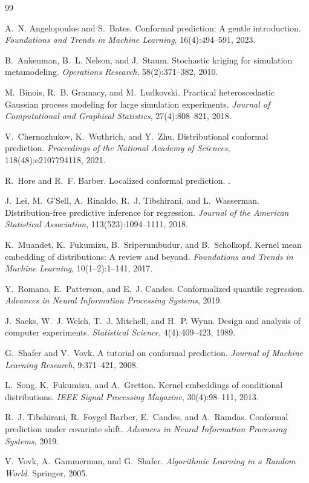\documentclass[11pt]{article}
\begin{document}
\begin{thebibliography}{99}

A.~N. Angelopoulos and S.~Bates.
\newblock Conformal prediction: A gentle introduction.
\newblock \emph{Foundations and Trends in Machine Learning}, 16(4):494--591, 2023.

B.~Ankenman, B.~L. Nelson, and J.~Staum.
\newblock Stochastic kriging for simulation metamodeling.
\newblock \emph{Operations Research}, 58(2):371--382, 2010.

M.~Binois, R.~B. Gramacy, and M.~Ludkovski.
\newblock Practical heteroscedastic Gaussian process modeling for large simulation experiments.
\newblock \emph{Journal of Computational and Graphical Statistics}, 27(4):808--821, 2018.

V.~Chernozhukov, K.~Wuthrich, and Y.~Zhu.
\newblock Distributional conformal prediction.
\newblock \emph{Proceedings of the National Academy of Sciences}, 118(48):e2107794118, 2021.

R.~Hore and R.~F. Barber.
\newblock Localized conformal prediction.
.

J.~Lei, M.~G'Sell, A.~Rinaldo, R.~J. Tibshirani, and L.~Wasserman.
\newblock Distribution-free predictive inference for regression.
\newblock \emph{Journal of the American Statistical Association}, 113(523):1094--1111, 2018.

K.~Muandet, K.~Fukumizu, B.~Sriperumbudur, and B.~Scholkopf.
\newblock Kernel mean embedding of distributions: A review and beyond.
\newblock \emph{Foundations and Trends in Machine Learning}, 10(1--2):1--141, 2017.

Y.~Romano, E.~Patterson, and E.~J. Candes.
\newblock Conformalized quantile regression.
\newblock \emph{Advances in Neural Information Processing Systems}, 2019.

J.~Sacks, W.~J. Welch, T.~J. Mitchell, and H.~P. Wynn.
\newblock Design and analysis of computer experiments.
\newblock \emph{Statistical Science}, 4(4):409--423, 1989.

G.~Shafer and V.~Vovk.
\newblock A tutorial on conformal prediction.
\newblock \emph{Journal of Machine Learning Research}, 9:371--421, 2008.

L.~Song, K.~Fukumizu, and A.~Gretton.
\newblock Kernel embeddings of conditional distributions.
\newblock \emph{IEEE Signal Processing Magazine}, 30(4):98--111, 2013.

R.~J. Tibshirani, R.~Foygel Barber, E.~Candes, and A.~Ramdas.
\newblock Conformal prediction under covariate shift.
\newblock \emph{Advances in Neural Information Processing Systems}, 2019.

V.~Vovk, A.~Gammerman, and G.~Shafer.
\newblock \emph{Algorithmic Learning in a Random World}.
\newblock Springer, 2005.

\end{thebibliography}
\end{document}

